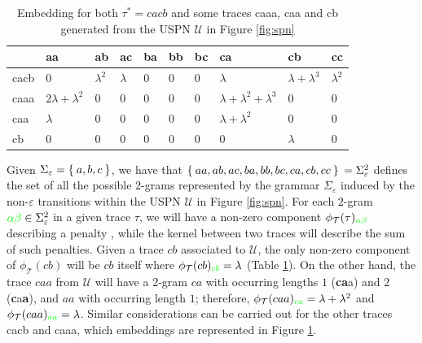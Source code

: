 {\begin{table}[!t]
\caption{Embedding for both $\tau^*=cacb$ and some traces caaa, caa and cb generated from the USPN $\mathcal{U}$ in Figure \ref{fig:spn}}\label{tb:embedding}
\begin{center}
	\begin{tabular}{l|l|l|l|l|l|l|l|l|l|}
		\toprule
		& aa    & ab   & ac    & ba   & bb   & bc & ca & cb & cc   \\
		\midrule
		cacb & $0$ & $\lambda^2$ & $\lambda$ & $0$  & $0$  & $0$ & $\lambda$ & $\lambda+\lambda^3$ & $\lambda^2$\\
		caaa & $2\lambda+\lambda^2$& $0$ & $0$ & $0$ & $0$ & $0$ & $\lambda+\lambda^2+\lambda^3$ & $0$ & $0$ \\
		caa  & $\lambda$ & $0$ & $0$ & $0$ & $0$ & $0$ & $\lambda+\lambda^2$ & $0$&  $0$\\
		cb   & $0$ & $0$ & $0$ & $0$ & $0$ & $0$ & $0$ & $\lambda$& $0$ \\
		\bottomrule
	\end{tabular}
\end{center}
\end{table}
\begin{example}\label{ex:wheredotiszero}
Given $\Sigma_\varepsilon=\Set{a,b,c}$, we have that $\Set{aa,ab,ac,ba,bb,bc,ca,cb,cc}\\=\Sigma^2_\varepsilon$ defines the set of all the possible $2$-grams represented by the grammar $\Sigma_\varepsilon$ induced by the non-$\varepsilon$ transitions within the USPN $\mathcal{U}$ in Figure \ref{fig:spn}. For each $2$-gram ${\color{green}\alpha\beta}\in\Sigma_\varepsilon^2$ in a given trace $\tau$, we will have a non-zero component $\phi_{\mathcal{T}}(\tau)_{\color{green}\alpha\beta}$ describing a penalty \cite{Gartner03}, while the kernel between two traces will describe the sum of such penalties. Given a trace $cb$ associated to $\mathcal{U}$,  the only non-zero component of $\phi_{\mathcal{T}}(cb)$ will be $cb$ itself where $\phi_{\mathcal{T}}(cb)_{\color{green}cb}=\lambda$ (Table \ref{tb:embedding}). On the other hand, the trace $caa$ from $\mathcal{U}$ will have a $2$-gram $ca$ with occurring lengths $1$ (\textbf{ca}a) and $2$ (\textbf{c}a\textbf{a}), and $aa$ with occurring length $1$; therefore, $\phi_{\mathcal{T}}(caa)_{\color{green}ca}=\lambda+\lambda^2$ and  $\phi_{\mathcal{T}}(caa)_{\color{green}aa}=\lambda$.  Similar considerations can be carried out for the other traces cacb and caaa, which embeddings are represented in Figure \ref{tb:embedding}. 


\end{example}}
